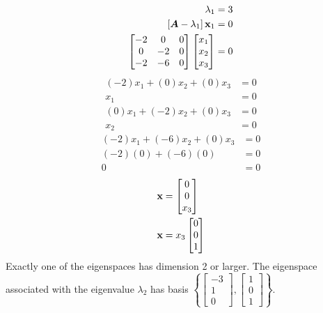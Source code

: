 \documentclass{article}
\begin{document}
\begin{align*}
	\lambda_1 & = 3 \\
	\left[ \matr{A} - \lambda_1 \right] \vect{x}_1 & = 0 \\
	\begin{bmatrix}
		-2 & 0 & 0 \\
		0 & -2 & 0 \\
		-2 & -6 & 0
	\end{bmatrix}
	\begin{bmatrix} x_1 \\ x_2 \\ x_3 \end{bmatrix} & = 0
\end{align*}
\begin{align*}
	(-2)x_1 + (0)x_2 + (0)x_3 & = 0 \\
	x_1 & = 0
\end{align*}
\begin{align*}
	(0)x_1 + (-2)x_2 + (0)x_3 & = 0 \\
	x_2 & = 0
\end{align*}
\begin{align*}
	(-2)x_1 + (-6)x_2 + (0)x_3 & = 0 \\
	(-2)(0) + (-6)(0) & = 0 \\
	0 & = 0
\end{align*}
\begin{align*}
	\vect{x} & = \begin{bmatrix} 0 \\ 0 \\ x_3 \end{bmatrix} \\
	\vect{x} & = x_3 \begin{bmatrix} 0 \\ 0 \\ 1 \end{bmatrix}
\end{align*}
Exactly one of the eigenspaces has dimension 2 or larger. The eigenspace associated with the eigenvalue $ \lambda_2 $ has basis $ \left\{ \begin{bmatrix} -3 \\ 1 \\ 0 \end{bmatrix}, \begin{bmatrix} 1 \\ 0 \\ 1 \end{bmatrix} \right\} $.
\end{document}
